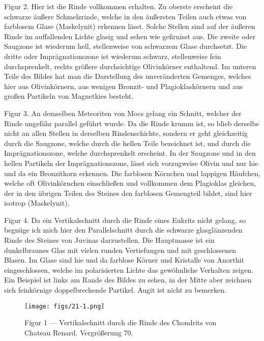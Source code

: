 \documentclass[a4paper, 11pt, oneside, polutonikogreek, german]{article}
\begin{document}
Figur 2. Hier ist die Rinde vollkommen erhalten. Zu oberste erscheint die schwarze äußere Schmelzrinde, welche in den äußersten Teilen auch etwas von farblosem Glase (Maskelynit) erkennen lässt. Solche Stellen sind auf der äußeren Rinde im auffallenden Lichte glasig und sehen wie gefirnisst aus. Die zweite oder Saugzone ist wiederum hell, stellenweise von schwarzem Glase durchsetzt. Die dritte oder Imprägnationszone ist wiederum schwarz, stellenweise fein durchsprenkelt, rechts größere durchsichtige Olivinkörner enthaltend. Im unteren Teile des Bildes hat man die Darstellung des unveränderten Gemenges, welches hier aus Olivinkörnern, aus wenigen Bronzit- und Plagioklaskörnern und aus großen Partikeln von Magnetkies besteht.

Figur 3. An demselben Meteoriten von Mocs gelang ein Schnitt, welcher der Rinde ungefähr parallel geführt wurde. Da die Rinde krumm ist, so blieb derselbe nicht an allen Stellen in derselben Rindenschichte, sondern er geht gleichzeitig durch die Saugzone, welche durch die hellen Teile bezeichnet ist, und durch die Imprägnationszone, welche durchsprenkelt erscheint. In der Saugzone und in den hellen Partikeln der Imprägnationszone, lässt sich vorzugweise Olivin und nur hie und da ein Bronzitkorn erkennen. Die farblosen Körnchen und lappigen Häufchen, welche oft Olivinkörnchen einschließen und vollkommen dem Plagioklas gleichen, der in den übrigen Teilen des Steines den farblosen Gemengteil bildet, sind hier isotrop (Maskelynit).

Figur 4. Da ein Vertikalschnitt durch die Rinde eines Eukrits nicht gelang, so begnüge ich mich hier den Parallelschnitt durch die schwarze glasglänzenden Rinde des Steines von Juvinas darzustellen. Die Hauptmasse ist ein dunkelbraunes Glas mit vielen runden Vertiefungen und mit geschlossenen Blasen. Im Glase sind hie und da farblose Körner und Kristalle von Anorthit eingeschlossen, welche im polarisierten Lichte das gewöhnliche Verhalten zeigen. Ein Beispiel ist links am Rande des Bildes zu sehen, in der Mitte aber zeichnen sich feinkörnige doppelbrechende Partikel. Augit ist nicht zu bemerken.
\clearpage

\vspace*{\fill}
\begin{figure}[H]
\centering
\texttt{[image: figs/21-1.png]}
\caption{\small Figur 1 --- Vertikalschnitt durch die Rinde des Chondrits von Chateau Renard. Vergrößerung 70.}
\end{figure}
\vspace*{\fill}
\clearpage
\end{document}
